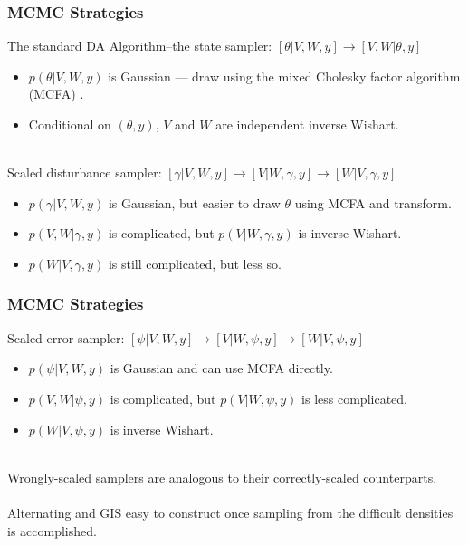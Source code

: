 \documentclass[xcolor=dvipsnames]{beamer}
\begin{document}
\begin{frame}
\frametitle{MCMC Strategies}
The standard DA Algorithm--the state sampler: {\color{blue}$[\theta|V,W,y] \to [V,W|\theta,y]$}
\begin{itemize}
\item $p(\theta|V,W,y)$ is Gaussian --- draw using the mixed Cholesky factor algorithm (MCFA) \citep{mccausland2011simulation}.
\item Conditional on $(\theta,y)$, $V$ and $W$ are independent inverse Wishart.\\~\\
\end{itemize}

Scaled disturbance sampler: {\color{blue}$[\gamma|V,W,y] \to [V|W,\gamma,y] \to [W|V,\gamma,y]$}
\begin{itemize}
\item $p(\gamma|V,W,y)$ is Gaussian, but easier to draw $\theta$ using MCFA and transform.
\item $p(V,W|\gamma,y)$ is complicated, but $p(V|W,\gamma,y)$ is inverse Wishart.
\item $p(W|V,\gamma,y)$ is still complicated, but less so.
\end{itemize}
\end{frame}

\begin{frame}
\frametitle{MCMC Strategies}
Scaled error sampler: {\color{blue}$[\psi|V,W,y] \to [V|W,\psi,y] \to [W|V,\psi,y]$}
\begin{itemize}
\item $p(\psi|V,W,y)$ is Gaussian and can use MCFA directly.
\item $p(V,W|\psi,y)$ is complicated, but $p(V|W,\psi,y)$ is less complicated. 
\item $p(W|V,\psi,y)$ is inverse Wishart.\\~\\
\end{itemize}

Wrongly-scaled samplers are analogous to their correctly-scaled counterparts.\\~\\

Alternating and GIS easy to construct once sampling from the difficult densities is accomplished.
\end{frame}
\end{document}
